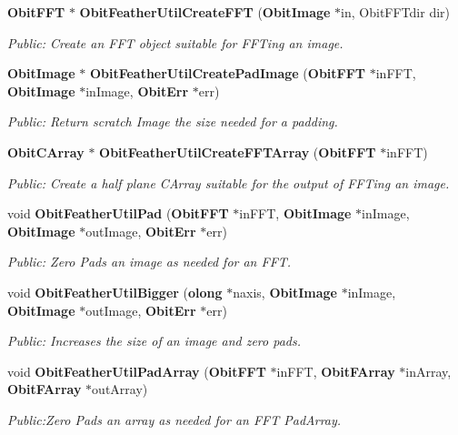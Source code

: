 \begin{CompactItemize}
\item 
{\bf Obit\-FFT} $\ast$ {\bf Obit\-Feather\-Util\-Create\-FFT} ({\bf Obit\-Image} $\ast$in, Obit\-FFTdir dir)
\begin{CompactList}\small\item\em Public: Create an FFT object suitable for FFTing an image. \item\end{CompactList}\item 
{\bf Obit\-Image} $\ast$ {\bf Obit\-Feather\-Util\-Create\-Pad\-Image} ({\bf Obit\-FFT} $\ast$in\-FFT, {\bf Obit\-Image} $\ast$in\-Image, {\bf Obit\-Err} $\ast$err)
\begin{CompactList}\small\item\em Public: Return scratch Image the size needed for a padding. \item\end{CompactList}\item 
{\bf Obit\-CArray} $\ast$ {\bf Obit\-Feather\-Util\-Create\-FFTArray} ({\bf Obit\-FFT} $\ast$in\-FFT)
\begin{CompactList}\small\item\em Public: Create a half plane CArray suitable for the output of FFTing an image. \item\end{CompactList}\item 
void {\bf Obit\-Feather\-Util\-Pad} ({\bf Obit\-FFT} $\ast$in\-FFT, {\bf Obit\-Image} $\ast$in\-Image, {\bf Obit\-Image} $\ast$out\-Image, {\bf Obit\-Err} $\ast$err)
\begin{CompactList}\small\item\em Public: Zero Pads an image as needed for an FFT. \item\end{CompactList}\item 
void {\bf Obit\-Feather\-Util\-Bigger} ({\bf olong} $\ast$naxis, {\bf Obit\-Image} $\ast$in\-Image, {\bf Obit\-Image} $\ast$out\-Image, {\bf Obit\-Err} $\ast$err)
\begin{CompactList}\small\item\em Public: Increases the size of an image and zero pads. \item\end{CompactList}\item 
void {\bf Obit\-Feather\-Util\-Pad\-Array} ({\bf Obit\-FFT} $\ast$in\-FFT, {\bf Obit\-FArray} $\ast$in\-Array, {\bf Obit\-FArray} $\ast$out\-Array)
\begin{CompactList}\small\item\em Public:Zero Pads an array as needed for an FFT Pad\-Array. \item\end{CompactList}\item 

\end{CompactItemize}
